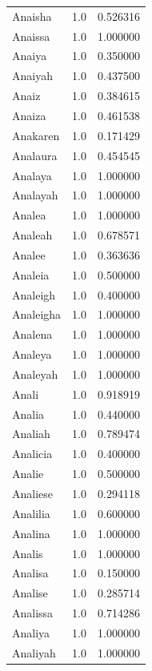 \documentclass[
  letterpaper,
  DIV=11,
  numbers=noendperiod]{scrreprt}
\begin{document}
\begin{tabular}{lrr}
Anaisha         &   1.0 &   0.526316 \\
Anaissa         &   1.0 &   1.000000 \\
Anaiya          &   1.0 &   0.350000 \\
Anaiyah         &   1.0 &   0.437500 \\
Anaiz           &   1.0 &   0.384615 \\
Anaiza          &   1.0 &   0.461538 \\
Anakaren        &   1.0 &   0.171429 \\
Analaura        &   1.0 &   0.454545 \\
Analaya         &   1.0 &   1.000000 \\
Analayah        &   1.0 &   1.000000 \\
Analea          &   1.0 &   1.000000 \\
Analeah         &   1.0 &   0.678571 \\
Analee          &   1.0 &   0.363636 \\
Analeia         &   1.0 &   0.500000 \\
Analeigh        &   1.0 &   0.400000 \\
Analeigha       &   1.0 &   1.000000 \\
Analena         &   1.0 &   1.000000 \\
Analeya         &   1.0 &   1.000000 \\
Analeyah        &   1.0 &   1.000000 \\
Anali           &   1.0 &   0.918919 \\
Analia          &   1.0 &   0.440000 \\
Analiah         &   1.0 &   0.789474 \\
Analicia        &   1.0 &   0.400000 \\
Analie          &   1.0 &   0.500000 \\
Analiese        &   1.0 &   0.294118 \\
Analilia        &   1.0 &   0.600000 \\
Analina         &   1.0 &   1.000000 \\
Analis          &   1.0 &   1.000000 \\
Analisa         &   1.0 &   0.150000 \\
Analise         &   1.0 &   0.285714 \\
Analissa        &   1.0 &   0.714286 \\
Analiya         &   1.0 &   1.000000 \\
Analiyah        &   1.0 &   1.000000 \\

\end{tabular}
\end{document}
